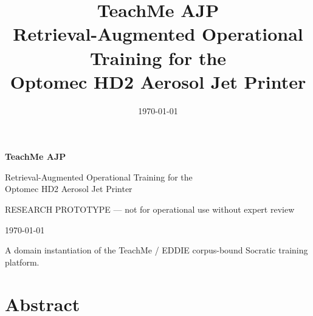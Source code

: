 \documentclass[11pt,letterpaper]{article}
\title{\vspace{-2em}\Huge\bfseries\sffamily\color{tmink} TeachMe AJP \\[0.4em]
  \Large\normalfont\color{tmmuted} Retrieval-Augmented Operational Training for the\\ Optomec HD2 Aerosol Jet Printer}
\date{\normalsize\sffamily\color{tmmuted}\today}
\author{}
\begin{document}
\begin{titlepage}
  \centering
  \vspace*{3cm}
  {\Huge\bfseries\sffamily\color{tmink} TeachMe AJP\par}
  \vspace{0.6em}
  {\Large\sffamily\color{tmmuted} Retrieval-Augmented Operational Training for the\\ Optomec HD2 Aerosol Jet Printer\par}
  \vspace{2em}
  \begin{tcolorbox}[colback=tmaccent!8, colframe=tmaccent!45, width=0.55\textwidth, sharp corners, boxrule=0.6pt]
    \centering\small\sffamily\color{tmink} RESEARCH PROTOTYPE --- not for operational use without expert review
  \end{tcolorbox}
  \vspace{3cm}
  {\sffamily\color{tmmuted}\today\par}
  \vfill
  {\small\sffamily\color{tmmuted} A domain instantiation of the TeachMe / EDDIE corpus-bound Socratic training platform.\par}
\end{titlepage}

\pagestyle{plain}
\tableofcontents
\clearpage
\pagestyle{fancy}

\section{Abstract}
\label{sec:abstract}
\end{document}
